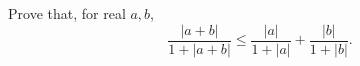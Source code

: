 Prove that, for real $a, b$,
\[ \frac{|a + b|}{1 + |a + b|} \leq \frac{|a|}{1 + |a|} + \frac{|b|}{1 + |b|}. \]
